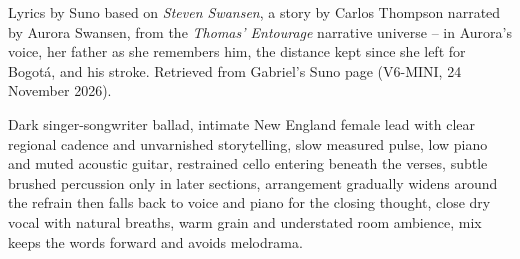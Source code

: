 
\begin{notes}
Lyrics by Suno based on \emph{Steven Swansen}, a story by Carlos Thompson narrated by Aurora Swansen, from the \emph{Thomas' Entourage} narrative universe -- in Aurora's voice, her father as she remembers him, the distance kept since she left for Bogotá, and his stroke. Retrieved from Gabriel's Suno page (V6-MINI, 24 November 2026).
\end{notes}
\begin{style}
Dark singer-songwriter ballad, intimate New England female lead with clear regional cadence and unvarnished storytelling, slow measured pulse, low piano and muted acoustic guitar, restrained cello entering beneath the verses, subtle brushed percussion only in later sections, arrangement gradually widens around the refrain then falls back to voice and piano for the closing thought, close dry vocal with natural breaths, warm grain and understated room ambience, mix keeps the words forward and avoids melodrama.
\end{style}
